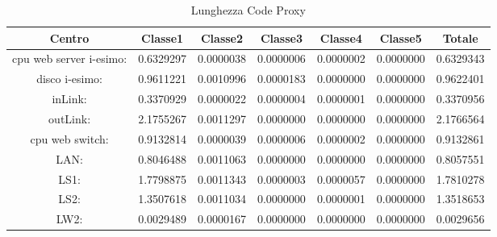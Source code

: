 \begin{table}[H]
\begin{center}\begin{scriptsize}
\begin{tabular}{||c|c|c|c|c|c|c||}
\hline
Centro &Classe1 &Classe2 &Classe3 &Classe4 &Classe5 &Totale\\
\hline
\hline
 cpu web server i-esimo: 	&0.6329297	&0.0000038	&0.0000006	&0.0000002	&0.0000000	&0.6329343\\
\hline
 disco i-esimo: 	&0.9611221	&0.0010996	&0.0000183	&0.0000000	&0.0000000	&0.9622401\\
\hline
 inLink: 	&0.3370929	&0.0000022	&0.0000004	&0.0000001	&0.0000000	&0.3370956\\
\hline
 outLink: 	&2.1755267	&0.0011297	&0.0000000	&0.0000000	&0.0000000	&2.1766564\\
\hline
 cpu web switch: 	&0.9132814	&0.0000039	&0.0000006	&0.0000002	&0.0000000	&0.9132861\\
\hline
 LAN: 	&0.8046488	&0.0011063	&0.0000000	&0.0000000	&0.0000000	&0.8057551\\
\hline
 LS1: 	&1.7798875	&0.0011343	&0.0000003	&0.0000057	&0.0000000	&1.7810278\\
\hline
 LS2: 	&1.3507618	&0.0011034	&0.0000000	&0.0000001	&0.0000000	&1.3518653\\
\hline
 LW2: 	&0.0029489	&0.0000167	&0.0000000	&0.0000000	&0.0000000	&0.0029656\\
\hline
\end{tabular}
\end{scriptsize}\end{center}
\caption{Lunghezza Code Proxy}
\label{lunghezzacode}
\end{table}

